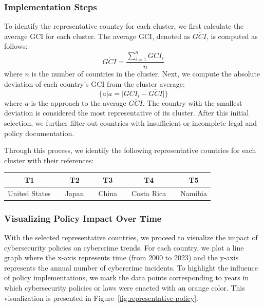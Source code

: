     \subsubsection*{Implementation Steps} %
        To identify the representative country for each cluster,
        we first calculate the average GCI for each cluster.
        The average GCI, denoted as \(\overline{GCI}\), is computed as follows:
        \[ \overline{GCI} = \frac{\sum_{i=1}^{n} GCI_i}{n} \]
        where \(n\) is the number of countries in the cluster.
        Next, we compute the absolute deviation of each country's GCI from the cluster average:
        \[ \{ a|a= |GCI_i - \overline{GCI}| \} \]
        where \(a\) is the approach to the average \( \overline{GCI} \).
        The country with the smallest deviation is considered the most representative of its cluster.
        After this initial selection, we further filter out countries with insufficient or incomplete legal and policy documentation.
    
        Through this process, we identify the following representative countries for each cluster with their references:
        \bigskip
        \begin{center}
            \begin{tabular}{ccccccccc}
                \hline
                \textbf{T1} &  & \textbf{T2} &  & \textbf{T3} &  & \textbf{T4} &  & \textbf{T5} \\
                \hline
                United States &  & Japan &  & China &  & Costa Rica &  & Namibia \\
            \end{tabular}
        \end{center}

    \subsubsection*{Visualizing Policy Impact Over Time} %
        With the selected representative countries,
        we proceed to visualize the impact of cybersecurity policies on cybercrime trends.
        For each country, we plot a line graph where
        the x-axis represents time (from 2000 to 2023) and the y-axis represents the annual number of cybercrime incidents.
        To highlight the influence of policy implementations,
        we mark the data points corresponding to years in which cybersecurity policies or laws were enacted with an orange color.
        This visualization is presented in Figure~\ref{fig:representative-policy}.
    
